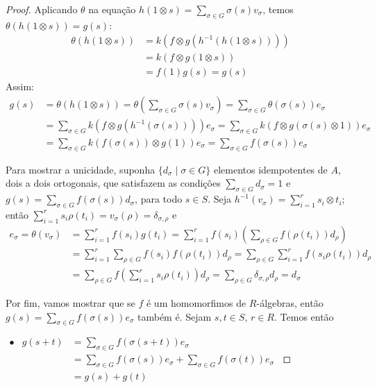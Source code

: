 \begin{teo}
\begin{proof}
Aplicando $\theta$ na equação $h(1\otimes s) = \sum_{\sigma \in G} \sigma(s)v_\sigma$, temos $\theta(h(1\otimes s)) = g(s)$:
\begin{align*}
        \theta(h(1\otimes s)) &= k\left(f\otimes g\left(h^{-1}\left(h\left( 1 \otimes s \right)\right)\right)\right) \\
        &= k\left(f\otimes g\left(1 \otimes s\right)\right) \\
        &= f(1)g(s) = g(s)
\end{align*}
Assim:
\begin{align*}
        g(s) & = \theta(h(1\otimes s)) = \theta\left(\sum_{\sigma\in G}\sigma(s)v_\sigma \right) = \sum_{\sigma \in G}\theta \left( \sigma(s) \right)e_\sigma \\
        &= \sum_{\sigma \in G} k\left(f\otimes g\left( h^{-1}\left( \sigma(s) \right)\right)\right) e_\sigma = \sum_{\sigma \in G} k\left(f\otimes g\left( \sigma(s)\otimes 1 \right)\right) e_\sigma \\
        &= \sum_{\sigma \in G} k\left(f\left(\sigma(s)\right)\otimes g(1) \right) e_\sigma = \sum_{\sigma\in G}f\left(\sigma(s)\right) e_\sigma
\end{align*} \par 
Para mostrar a unicidade, suponha $\{d_\sigma \mid \sigma \in G \}$ elementos idempotentes de $A$, dois a dois ortogonais, que satisfazem as condições $\sum_{\sigma \in G} d_\sigma = 1$ e $g(s) = \sum_{\sigma \in G} f(\sigma(s)) d_\sigma$, para todo $s \in S$. Seja $h^{-1}(v_\sigma) = \sum_{i=1}^{r} s_i \otimes t_i$; então $\sum_{i=1}^{r}s_i\rho(t_i) = v_\sigma(\rho)=\delta_{\sigma,\rho}$ e
\begin{align*}
        e_\sigma = \theta(v_\sigma) &= \sum_{i=1}^{r} f(s_i)g(t_i) = \sum_{i=1}^{r}f(s_i) \left(\sum_{\rho \in G} f(\rho(t_i)) d_\rho\right) \\
        &= \sum_{i=1}^{r}\sum_{\rho \in G}f(s_i)f(\rho(t_i))d_\rho = \sum_{\rho \in G} \sum_{i=1}^{r} f(s_i \rho(t_i))d_\rho \\
        &= \sum_{\rho \in G} f\left( \sum_{i=1}^{r}s_i \rho(t_i) \right)d_\rho = \sum_{\rho \in G} \delta_{\sigma, \rho} d_\rho = d_\sigma
\end{align*} \par
Por fim, vamos mostrar que se $f$ é um homomorfimos de $R$-álgebras, então $g(s) = \sum_{\sigma \in G}f(\sigma(s)) e_\sigma$ também é. Sejam $s,t \in S$, $r \in R$. Temos então

\vspace{0.3cm}
$\begin{array}{rrl}
        \bullet &g(s+t) &= \sum_{\sigma\in G}f(\sigma(s+t))e_\sigma \\
        & &= \sum_{\sigma \in G}f(\sigma(s))e_\sigma + \sum_{\sigma \in G} f(\sigma(t))e_\sigma \\
        & &= g(s) + g(t)
\end{array}$


\end{proof}
\end{teo}
